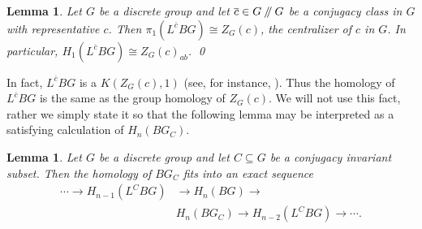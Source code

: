 \documentclass[10pt,twocolumn,amsmath,amssymb,aps,pra,secnumarabic,
    nofootinbib,groupedaddress]{revtex4-1}
\newtheorem{lemma}[theorem]{Lemma}
\newcommand{\sslash}{\mathbin{/\mkern-5mu/}}
\begin{document}
\begin{lemma}
Let $G$ be a discrete group and let $\overline{c} \in G\sslash G$ be a conjugacy class in $G$ with representative $c$.  Then $\pi_1(L^{\overline{c}}BG) \cong Z_G(c)$, the centralizer of $c$ in $G$.  In particular, $H_1(L^{\overline{c}}BG) \cong Z_G(c)_{ab}$.   \qed
\label{l:LBG}
\end{lemma}

In fact, $L^{\overline{c}}BG$ is a $K(Z_G(c),1)$ (see, for instance, \cite{someone}). Thus the homology of $L^{\overline{c}}BG$ is the same as the group homology of $Z_G(c)$.  We will not use this fact, rather we simply state it so that the following lemma may be interpreted as a satisfying calculation of $H_n(BG_C)$.

\begin{lemma}
Let $G$ be a discrete group and let $C \subseteq G$ be a conjugacy invariant subset.  Then the homology of $BG_C$ fits into an exact sequence
\[\begin{aligned}
\cdots \to H_{n-1}(L^CBG) &\to H_n(BG) \to \\ &H_n(BG_C) \to H_{n-2}(L^CBG) \to \cdots. \end{aligned}\]
\label{l:exact}
\end{lemma}
\end{document}
